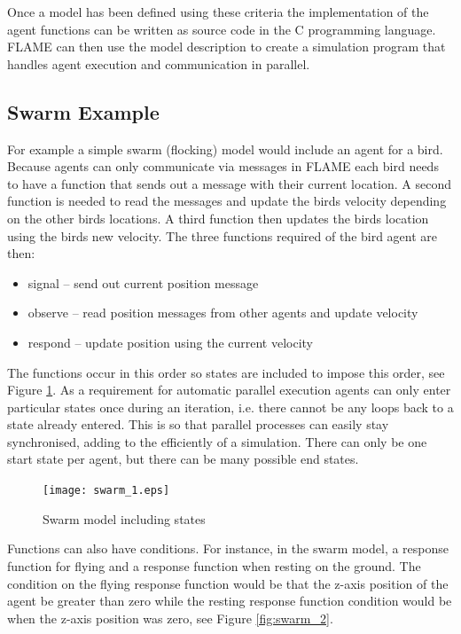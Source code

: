 Once a model has been defined using these criteria the implementation of the
agent functions can be written as source code in the C programming language.
FLAME can then use the model description to create a simulation program that
handles agent execution and communication in parallel.

\subsection{Swarm Example}

For example a simple swarm (flocking) model would include an agent for a bird.
Because agents can only communicate via messages in FLAME each bird needs to
have a function that sends out a message with their current location. A second
function is needed to read the messages and update the birds velocity depending
on the other birds locations. A third function then updates the birds location
using the birds new velocity. The three functions required of the bird agent are
then:

\begin{itemize}
\item signal -- send out current position message
\item observe -- read position messages from other agents and update velocity
\item respond -- update position using the current velocity
\end{itemize}

The functions occur in this order so states are included to impose this
order, see Figure \ref{fig:swarm_1}. As a requirement for automatic parallel
execution agents can only enter particular states once during an iteration,
i.e. there cannot be any loops back to a state already entered. This is so that
parallel processes can easily stay synchronised, adding to the efficiently of a
simulation. There can only be one start state per agent, but there can be many
possible end states.

\begin{figure}[ht]
\begin{center}
\texttt{[image: swarm\_1.eps]}
\caption{Swarm model including states}
\label{fig:swarm_1}
\end{center}
\end{figure}

Functions can also have conditions. For instance, in
the swarm model, a response function for flying and a response function when
resting on the ground. The condition on the flying response function would be that the
z-axis position of the agent be greater than zero while the resting response
function condition would be when the z-axis position was zero, see Figure
\ref{fig:swarm_2}.

